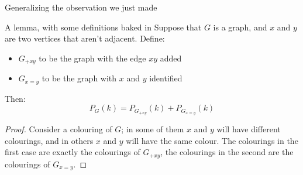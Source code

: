 \documentclass{beamer}
\begin{document}
\begin{frame}{Generalizing the observation we just made}
  
  \begin{block}{A lemma, with some definitions baked in}
    Suppose that $G$ is a graph, and $x$ and $y$ are two vertices that aren't adjacent. Define:
    \begin{itemize}
    \item  $G_{+xy}$ to be the graph with the edge $xy$ added
    \item $G_{x=y}$ to be the graph with $x$ and $y$ identified
    \end{itemize}
    Then:
    $$P_G(k)=P_{G_{+xy}}(k)+P_{G_{x=y}}(k)$$
  \end{block}

  \begin{proof} Consider a colouring of $G$; in some of them $x$ and $y$ will have different colourings, and in others $x$ and $y$ will have the same colour.  The colourings in the first case are exactly the colourings of $G_{+xy}$, the colourings in the second are the colourings of $G_{x=y}$.
   \end{proof}
    
    \end{frame}
\end{document}
